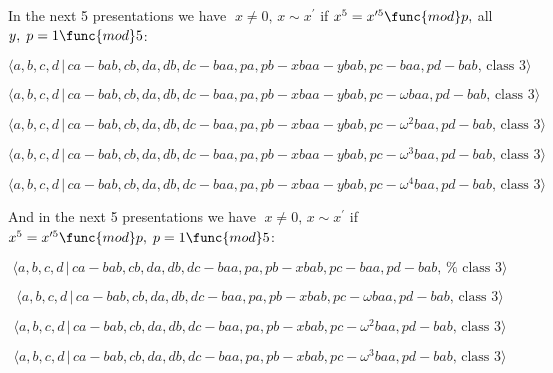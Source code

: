 \documentclass[10pt]{article}
\begin{document}
In the next 5 presentations we have $\;x\neq 0,\,x\sim x^{\prime }$ if $%
x^{5}=x^{\prime 5}\func{mod}p,$ all $y,\;p=1\func{mod}5$:

\begin{equation}
\langle a,b,c,d\,|\,ca-bab,cb,da,db,dc-baa,pa,pb-xbaa-ybab,pc-baa,pd-bab,\,%
\text{class }3\rangle  \tag{7.3586}
\end{equation}

\begin{equation}
\langle a,b,c,d\,|\,ca-bab,cb,da,db,dc-baa,pa,pb-xbaa-ybab,pc-\omega
baa,pd-bab,\,\text{class }3\rangle  \tag{7.3587}
\end{equation}

\begin{equation}
\langle a,b,c,d\,|\,ca-bab,cb,da,db,dc-baa,pa,pb-xbaa-ybab,pc-\omega
^{2}baa,pd-bab,\,\text{class }3\rangle  \tag{7.3588}
\end{equation}

\begin{equation}
\langle a,b,c,d\,|\,ca-bab,cb,da,db,dc-baa,pa,pb-xbaa-ybab,pc-\omega
^{3}baa,pd-bab,\,\text{class }3\rangle  \tag{7.3589}
\end{equation}

\begin{equation}
\langle a,b,c,d\,|\,ca-bab,cb,da,db,dc-baa,pa,pb-xbaa-ybab,pc-\omega
^{4}baa,pd-bab,\,\text{class }3\rangle  \tag{7.3590}
\end{equation}

And in the next 5 presentations we have $\;x\neq 0,\,x\sim x^{\prime }$ if $%
x^{5}=x^{\prime 5}\func{mod}p,\;p=1\func{mod}5$:

\begin{equation}
\langle a,b,c,d\,|\,ca-bab,cb,da,db,dc-baa,pa,pb-xbab,pc-baa,pd-bab,\,\text{%
class }3\rangle  \tag{7.3591}
\end{equation}

\begin{equation}
\langle a,b,c,d\,|\,ca-bab,cb,da,db,dc-baa,pa,pb-xbab,pc-\omega baa,pd-bab,\,%
\text{class }3\rangle  \tag{7.3592}
\end{equation}

\begin{equation}
\langle a,b,c,d\,|\,ca-bab,cb,da,db,dc-baa,pa,pb-xbab,pc-\omega
^{2}baa,pd-bab,\,\text{class }3\rangle  \tag{7.3593}
\end{equation}

\begin{equation}
\langle a,b,c,d\,|\,ca-bab,cb,da,db,dc-baa,pa,pb-xbab,pc-\omega
^{3}baa,pd-bab,\,\text{class }3\rangle  \tag{7.3594}
\end{equation}
\end{document}
